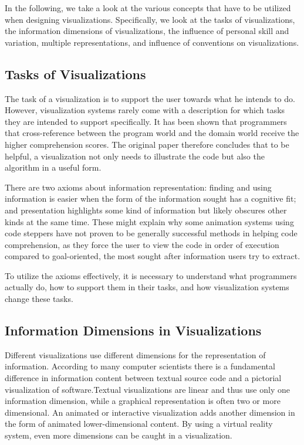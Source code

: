 \documentclass[11pt, a4paper, ngerman, twoside]{article}
\theoremstyle{plain}\newtheorem{Lemma}{Lemma}
\theoremstyle{plain}\newtheorem{Satz}[Lemma]{Satz}
\theoremstyle{definition}\newtheorem{Definition}[Lemma]{Definition}
\theoremstyle{definition}\newtheorem*{Beispiel}{Beispiel}
\theoremstyle{remark}\newtheorem*{Bemerkung}{Bemerkung}
\begin{document}
In the following, we take a look at the various concepts that have to be utilized when designing visualizations. Specifically, we look at the tasks of visualizations, the information dimensions of visualizations, the influence of personal skill and variation, multiple representations, and influence of conventions on visualizations.

\subsection{Tasks of Visualizations}

The task of a visualization is to support the user towards what he intends to do. However, visualization systems rarely come with a description for which tasks they are intended to support specifically. It has been shown that programmers that cross-reference between the program world and the domain world receive the higher comprehension scores\cite{penn}. The original paper therefore concludes that to be helpful, a visualization not only needs to illustrate the code but also the algorithm in a useful form.

There are two axioms about information representation: finding and using information is easier when the form of the information sought has a cognitive fit; and presentation highlights some kind of information but likely obscures other kinds at the same time. These might explain why some animation systems using code steppers have not proven to be generally successful methods in helping code comprehension, as they force the user to view the code in order of execution compared to goal-oriented, the most sought after information users try to extract.

To utilize the axioms effectively, it is necessary to understand what programmers actually do, how to support them in their tasks, and how visualization systems change these tasks.

\subsection{Information Dimensions in Visualizations}

Different visualizations use different dimensions for the representation of information. According to many computer scientists there is a fundamental difference in information content between textual source code and a pictorial visualization of software\cite{blackwell}.Textual visualizations are linear and thus use only one information dimension, while a graphical representation is often two or more dimensional. An animated or interactive visualization adds another dimension in the form of animated lower-dimensional content. By using a virtual reality system, even more dimensions can be caught in a visualization.
\end{document}
